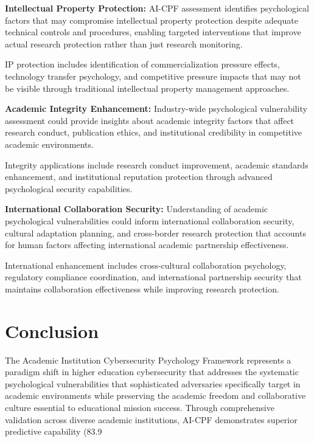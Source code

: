 \documentclass[10pt, twocolumn]{article}
\begin{document}
\textbf{Intellectual Property Protection:} AI-CPF assessment identifies psychological factors that may compromise intellectual property protection despite adequate technical controls and procedures, enabling targeted interventions that improve actual research protection rather than just research monitoring.

IP protection includes identification of commercialization pressure effects, technology transfer psychology, and competitive pressure impacts that may not be visible through traditional intellectual property management approaches.

\textbf{Academic Integrity Enhancement:} Industry-wide psychological vulnerability assessment could provide insights about academic integrity factors that affect research conduct, publication ethics, and institutional credibility in competitive academic environments.

Integrity applications include research conduct improvement, academic standards enhancement, and institutional reputation protection through advanced psychological security capabilities.

\textbf{International Collaboration Security:} Understanding of academic psychological vulnerabilities could inform international collaboration security, cultural adaptation planning, and cross-border research protection that accounts for human factors affecting international academic partnership effectiveness.

International enhancement includes cross-cultural collaboration psychology, regulatory compliance coordination, and international partnership security that maintains collaboration effectiveness while improving research protection.

\section{Conclusion}

The Academic Institution Cybersecurity Psychology Framework represents a paradigm shift in higher education cybersecurity that addresses the systematic psychological vulnerabilities that sophisticated adversaries specifically target in academic environments while preserving the academic freedom and collaborative culture essential to educational mission success. Through comprehensive validation across diverse academic institutions, AI-CPF demonstrates superior predictive capability (83.9%
\end{document}
